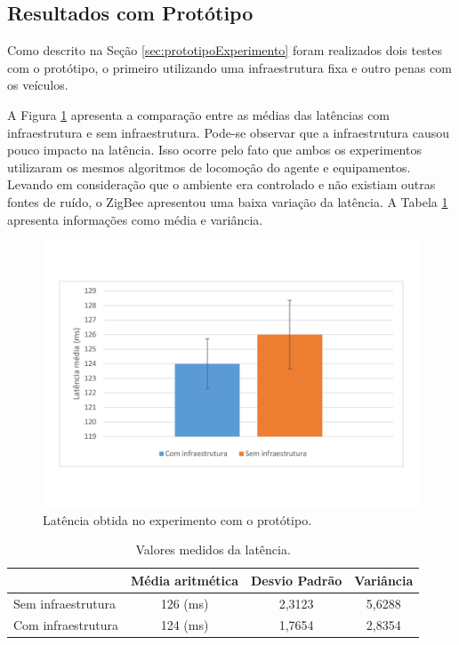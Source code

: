 \subsection{Resultados com Protótipo}

Como descrito na Seção \ref{sec:prototipoExperimento} foram realizados dois testes com o protótipo, o primeiro utilizando uma infraestrutura fixa e outro penas com os veículos.

A Figura \ref{fig:experimentoRealLatencia} apresenta a comparação entre as médias das latências com infraestrutura e sem infraestrutura. Pode-se observar que a infraestrutura causou pouco impacto na latência. Isso ocorre pelo fato que ambos os experimentos utilizaram os mesmos algoritmos de locomoção do agente e equipamentos. Levando em consideração que o ambiente era controlado e não existiam outras fontes de ruído, o ZigBee apresentou uma baixa variação da latência. A Tabela \ref{tab:experimentoRealLatencia} apresenta informações como média e variância. 

\begin{figure}[htbp]
	\centering
	\includegraphics[scale=0.4]{resultados/graficos/experimentoRealLatencia.pdf}
	\caption{Latência obtida no experimento com o protótipo.}
	\label{fig:experimentoRealLatencia}
\end{figure}


\begin{table}[ht]
	\caption{Valores medidos da latência.}
	\centering
	\begin{tabular}{ | l | c | c | c|}
		\hline
		& Média aritmética & Desvio Padrão & Variância \\ \hline
		Sem infraestrutura & 126 (ms) & 2,3123 & 5,6288  \\ \hline
		Com infraestrutura & 124 (ms) & 1,7654 & 2,8354 \\ \hline
	\end{tabular}
	\label{tab:experimentoRealLatencia}
\end{table}

